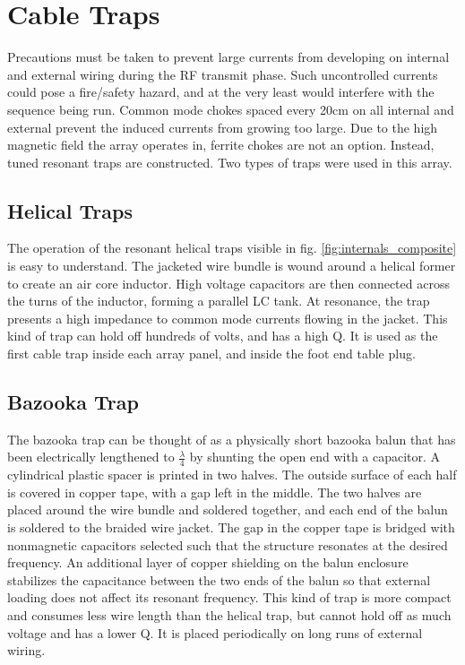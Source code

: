 \section{Cable Traps}
Precautions must be taken to prevent large currents from developing on internal and external wiring during the RF
transmit phase. Such uncontrolled currents could pose a fire/safety hazard, and at the very least would interfere with
the sequence being run. Common mode chokes spaced every 20cm on all internal and external prevent the induced currents
from growing too large. Due to the high magnetic field the array operates in, ferrite chokes are not an option. Instead,
tuned resonant traps are constructed. Two types of traps were used in this array.

\subsection{Helical Traps}
The operation of the resonant helical traps visible in fig. \ref{fig:internals_composite} is easy to understand.  The
jacketed wire bundle is wound around a helical former to create an air core inductor. High voltage capacitors are then
connected across the turns of the inductor, forming a parallel LC tank. At resonance, the trap presents a high impedance
to common mode currents flowing in the jacket.  This kind of trap can hold off hundreds of volts, and has a high Q. It
is used as the first cable trap inside each array panel, and inside the foot end table plug.

\subsection{Bazooka Trap}

The bazooka trap can be thought of as a physically short bazooka balun that has been electrically lengthened to
$\frac{\lambda}{4}$ by shunting the open end with a capacitor. A cylindrical plastic spacer is printed in two halves.
The outside surface of each half is covered in copper tape, with a gap left in the middle. The two halves are placed
around the wire bundle and soldered together, and each end of the balun is soldered to the braided wire jacket. The gap
in the copper tape is bridged with nonmagnetic capacitors selected such that the structure resonates at the desired
frequency. An additional layer of copper shielding on the balun enclosure stabilizes the capacitance between the two
ends of the balun so that external loading does not affect its resonant frequency.  This kind of trap is more compact
and consumes less wire length than the helical trap, but cannot hold off as much voltage and has a lower Q. It is
placed periodically on long runs of external wiring.


